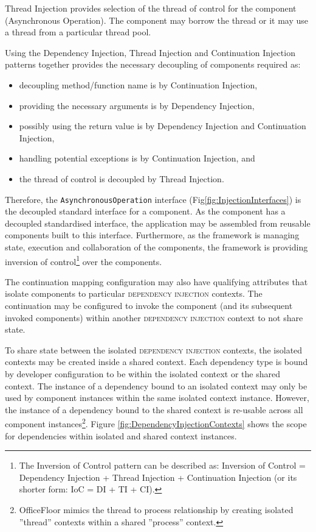 \documentclass[prodmode]{style/acmlarge}
\begin{document}
Thread Injection provides selection of the thread of control for the component
(Asynchronous Operation).  The component may borrow the thread or it may use a
thread from a particular thread pool.

Using the Dependency Injection, Thread Injection and Continuation Injection
patterns together provides the necessary decoupling of components required as:
\begin{itemize}
  \item decoupling method/function name is by Continuation Injection,
  \item providing the necessary arguments is by Dependency Injection,
  \item possibly using the return value is by Dependency Injection and Continuation Injection,
  \item handling potential exceptions is by Continuation Injection, and
  \item the thread of control is decoupled by Thread Injection.
\end{itemize}

Therefore, the \texttt{AsynchronousOperation} interface
(Fig\ref{fig:InjectionInterfaces}) is the decoupled standard interface for a
component.  As the component has a decoupled standardised interface, the
application may be assembled from reusable components built to this interface. 
Furthermore, as the framework is managing state, execution and collaboration of
the components, the framework is providing inversion of control\footnote{The
Inversion of Control pattern can be described as: Inversion of Control =
Dependency Injection + Thread Injection + Continuation Injection (or its shorter
form: IoC = DI + TI + CI).} over the components.


The continuation mapping configuration may also have qualifying attributes that
isolate components to particular \textsc{dependency injection} contexts.  The
continuation may be configured to invoke the component (and its subsequent
invoked components) within another \textsc{dependency injection} context to not
share state.

To share state between the isolated \textsc{dependency injection} contexts, the
isolated contexts may be created inside a shared context.  Each dependency type
is bound by developer configuration to be within the isolated context or the
shared context.  The instance of a dependency bound to an isolated context may
only be used by component instances within the same isolated context instance. 
However, the instance of a dependency bound to the shared context is re-usable
across all component instances\footnote{OfficeFloor \cite{officefloor} mimics
the thread to process relationship by creating isolated ''thread'' contexts
within a shared ''process'' context.}.  Figure
\ref{fig:DependencyInjectionContexts} shows the scope for dependencies within
isolated and shared context instances.
\end{document}
